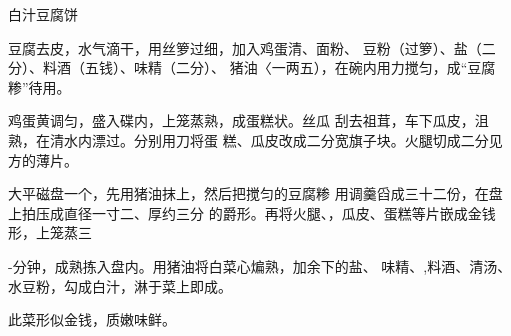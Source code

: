\begin{recipe}[金钱豆腐]{白汁豆腐饼}

\ingredients


\cooking

\step 豆腐去皮，水气滴干，用丝箩过细，加入鸡蛋清、面粉、 豆粉（过箩）、盐（二分）、料酒（五钱）、味精（二分）、 猪油〈一两五），在碗内用力搅匀，成“豆腐糁”待用。

\step 鸡蛋黄调匀，盛入碟内，上笼蒸熟，成蛋糕状。丝瓜 刮去祖茸，车下瓜皮，沮熟，在清水内漂过。分别用刀将蛋 糕、瓜皮改成二分宽旗子块。火腿切成二分见方的薄片。

\step 大平磁盘一个，先用猪油抹上，然后把搅匀的豆腐糁 用调羹舀成三十二份，在盘上拍压成直径一寸二、厚约三分 的爵形。再将火腿、，瓜皮、蛋糕等片嵌成金钱形，上笼蒸三

-分钟，成熟拣入盘内。用猪油将白菜心煸熟，加余下的盐、 味精、,料酒、清汤、水豆粉，勾成白汁，淋于菜上即成。

\notes

此菜形似金钱，质嫩味鲜。

\end{recipe}

